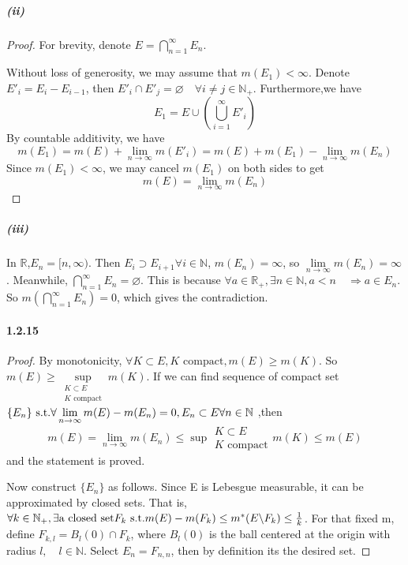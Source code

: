 \documentclass{article}
\begin{document}
\subparagraph{(ii)}
\begin{proof}
For brevity, denote $E=\bigcap\limits_{n=1}^{\infty}E_n$.

Without loss of generosity, we may assume that $m(E_1)<\infty$. Denote $E'_i=E_i-E_{i-1}$, then $E'_i\cap E'_j=\varnothing \quad \forall i\neq j\in\mathbb{N}_+$. Furthermore,we have
\[E_1=E\cup(\bigcup_{i=1}^{\infty}E'_i)\]
By countable additivity, we have
\[m(E_1)=m(E)+\lim_{n\to\infty}m(E'_i)=m(E)+m(E_1)-\lim_{n\to\infty}m(E_n)\]
Since $m(E_1)<\infty$, we may cancel $m(E_1)$ on both sides to get
\[m(E)=\lim_{n\to\infty}m(E_n)\]
\end{proof}

\subparagraph{(iii)}
In $\mathbb{R}$,$E_n=[n,\infty)$. Then $E_i\supset E_{i+1}\forall i\in\mathbb{N}$, $m(E_n)=\infty$, so $\lim\limits_{n\to\infty}m(E_n)=\infty$. Meanwhile, $\bigcap\limits_{n=1}^{\infty}E_n=\varnothing$. This is because $\forall a \in \mathbb{R}_+, \exists n\in \mathbb{N}, a<n\quad \Rightarrow a\in E_n$. So $m(\bigcap\limits_{n=1}^{\infty}E_n)=0$, which gives the contradiction.

\paragraph{1.2.15}
\begin{proof}
By monotonicity, $\forall K\subset E, K \text{ compact},m(E)\geq m(K)$. So $m(E)\geq \sup\limits_{\substack{K\subset E\\ K\text{ compact}}}m(K)$. If we can find sequence of compact set$\{E_n\}\text{ s.t.} \forall \lim\limits_{n\to\infty}m(E)-m(E_n)=0, E_n\subset E\forall n\in\mathbb{N}$ ,then 
\[m(E)=\lim_{n\to\infty}m(E_n)\leq\sup{\substack{K\subset E\\ K\text{ compact}}}m(K)\leq m(E)\]
and the statement is proved.

Now construct $\{E_n\}$ as follows. Since E is Lebesgue measurable, it can be approximated by closed sets. That is, $\forall k\in \mathbb{N}_+,\exists \text{a closed set}F_k \text{ s.t.} m(E)-m(F_k)\leq m^*(E\backslash F_k)\leq \frac 1 k$. For that fixed m, define $F_{k,l}=B_l(0)\cap F_k$, where $B_l(0)$ is the ball centered at the origin with radius $l,\quad l\in \mathbb{N}$. Select $E_n=F_{n,n}$, then by definition its the desired set. 
\end{proof}
\end{document}
